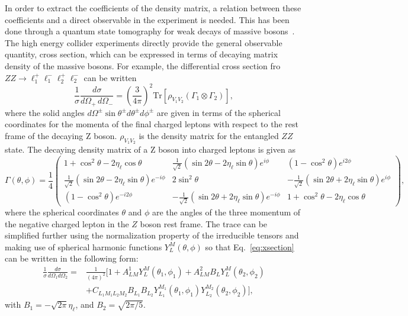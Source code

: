 \documentclass{article}
\begin{document}
In order to extract the coefficients of the density matrix, a relation between these coefficients and a direct observable in the experiment is needed. This has been done through a quantum state tomography for weak decays of massive bosons~\cite{Ashby-Pickering:2022umy}. The high energy collider experiments directly provide the general observable quantity, cross section, which can be expressed in terms of decaying matrix density of the massive bosons. For example, the differential cross section fro $ZZ\to \ell_1^+\ell_1^-\ell_2^+\ell_2^-$ can be written~\cite{Rahaman:2021fcz}
\begin{equation}
    \frac{1}{\sigma} \frac{d\sigma}{d\Omega_+ \, d\Omega_-} = \left( \frac{3}{4\pi} \right)^2 \mathrm{Tr} \left[ \rho_{V_1 V_2} \left( \Gamma_1 \otimes \Gamma_2 \right) \right],
    \label{eq:xsection}
\end{equation}
where the solid angles $d\Omega^{\pm} \sin\theta^{\pm}d\theta^{\pm}d\phi^{\pm}$ are given in terms of the spherical coordinates for the momenta of the final charged leptons with respect to the rest frame of the decaying Z boson. $\rho_{V_1V_2}$ is the density matrix for the entangled $ZZ$ state. The decaying density matrix of a Z boson into charged leptons is given as~\cite{Rahaman:2021fcz,Aguilar-Saavedra:2022wam,Aguilar-Saavedra:2022mpg}
\begin{equation}
\Gamma(\theta, \phi) = \frac{1}{4} 
\begin{pmatrix}
1 + \cos^2 \theta - 2 \eta_\ell \cos \theta & \frac{1}{\sqrt{2}} (\sin 2\theta - 2\eta_\ell \sin \theta)e^{i\phi} & (1 - \cos^2 \theta)e^{i2\phi} \\
\frac{1}{\sqrt{2}} (\sin 2\theta - 2\eta_\ell \sin \theta)e^{-i\phi} & 2 \sin^2 \theta & -\frac{1}{\sqrt{2}} (\sin 2\theta + 2\eta_\ell \sin \theta)e^{i\phi} \\
(1 - \cos^2 \theta)e^{-i2\phi} & -\frac{1}{\sqrt{2}} (\sin 2\theta + 2\eta_\ell \sin \theta)e^{-i\phi} & 1 + \cos^2 \theta - 2 \eta_\ell \cos \theta
\end{pmatrix},
\end{equation}
where the spherical coordinates $\theta$ and $\phi$ are the angles of the three momentum of the negative  charged lepton in the $Z$ boson rest frame. The trace can be simplified further using the normalization property of the irreducible tensors and making use of spherical harmonic functions $Y_L^M(\theta, \phi)$ so that Eq.~\ref{eq:xsection} can be written in the following form:
\begin{align}
    \frac{1}{\sigma}\frac{d\sigma}{d\Omega_1d\Omega_2} =&\frac{1}{(4\pi)^2} [ 1+A_{LM}^1Y_L^M(\theta_1,\phi_1)+A_{LM}^2B_LY_L^M(\theta_2,\phi_2)\\
    & +C_{L_1M_1L_2M_2}B_{L_1}B_{L_2}Y_{L_1}^{M_1}(\theta_1,\phi_1)Y_{L_2}^{M_2}(\theta_2,\phi_2)
    ] ,
\end{align}
with $B_1 = -\sqrt{2\pi}\eta_{\ell}$, and $B_2 = \sqrt{2\pi/5}$.
\end{document}
